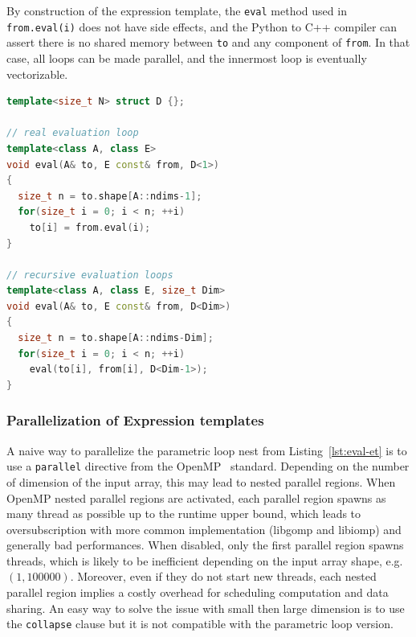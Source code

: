 \documentclass[10pt, preprint]{sigplanconf}
\begin{document}
By construction of the expression template, the \texttt{eval} method used in
\texttt{from.eval(i)} does not have side effects, and the Python to C++
compiler can assert there is no shared memory between \texttt{to} and any
component of \texttt{from}. In that case, all loops can be made parallel, and
the innermost loop is eventually vectorizable.

\begin{lstlisting}[language=c++, label={lst:eval-et}, caption={Evaluation body of an expression template}]
template<size_t N> struct D {};

// real evaluation loop
template<class A, class E>
void eval(A& to, E const& from, D<1>)
{
  size_t n = to.shape[A::ndims-1];
  for(size_t i = 0; i < n; ++i)
    to[i] = from.eval(i);
}

// recursive evaluation loops
template<class A, class E, size_t Dim>
void eval(A& to, E const& from, D<Dim>)
{
  size_t n = to.shape[A::ndims-Dim];
  for(size_t i = 0; i < n; ++i)
    eval(to[i], from[i], D<Dim-1>);
}
\end{lstlisting}

\subsubsection{Parallelization of Expression templates}

A naive way to parallelize the parametric loop nest from
Listing~\ref{lst:eval-et} is to use a \texttt{parallel} directive from the
OpenMP~\cite{openmp4} standard. Depending on the number of dimension of the
input array, this may lead to nested parallel regions. When OpenMP nested
parallel regions are activated, each parallel region spawns as many thread as
possible up to the runtime upper bound, which leads to oversubscription with
more common implementation (libgomp and libiomp) and generally bad performances. When
disabled, only the first parallel region spawns threads, which is likely to be
inefficient depending on the input array shape, e.g. $(1,100000)$. Moreover,
even if they do not start new threads, each nested parallel region implies a
costly overhead for scheduling computation and data sharing. An easy way to solve
the issue with small then large dimension is to use the \texttt{collapse}
clause but it is not compatible with the parametric loop version.
\end{document}
